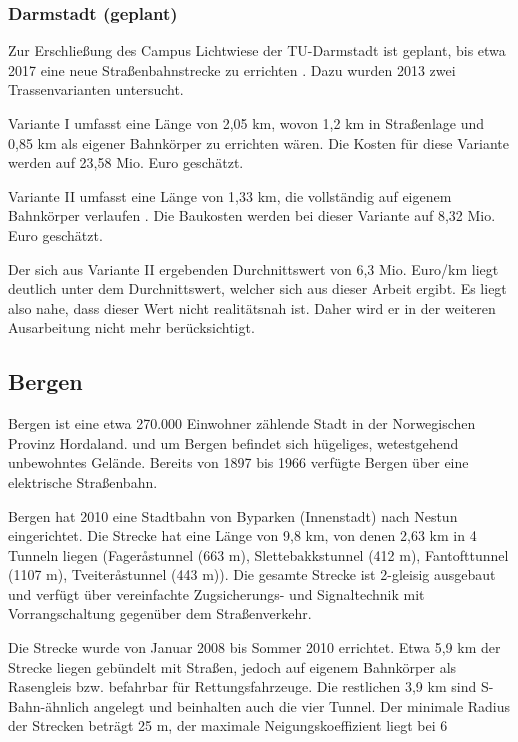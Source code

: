\cite{eoDaAr2}
\cite{eoDaAr3}

\subsubsection*{Darmstadt (geplant)}

Zur Erschließung des Campus Lichtwiese der TU-Darmstadt ist geplant, bis etwa 2017 eine neue
Straßenbahnstrecke zu errichten \cite{mrDaLw}. Dazu wurden 2013 zwei Trassenvarianten untersucht.

Variante I umfasst eine Länge von 2,05 km, wovon 1,2 km in Straßenlage und 0,85 km als
eigener Bahnkörper zu errichten wären. Die Kosten für diese Variante werden auf 23,58 Mio.
Euro geschätzt.

Variante II umfasst eine Länge von 1,33 km, die vollständig auf eigenem Bahnkörper verlaufen \cite{eoDaLw}.
Die Baukosten werden bei dieser Variante auf 8,32 Mio. Euro geschätzt.

Der sich aus Variante II ergebenden Durchnittswert von 6,3 Mio. Euro/km liegt deutlich unter
dem Durchnittswert, welcher sich aus dieser Arbeit ergibt. Es liegt also nahe, dass dieser
Wert nicht realitätsnah ist. Daher wird er in der weiteren Ausarbeitung nicht mehr
berücksichtigt.

\subsection{Bergen}

Bergen ist eine etwa 270.000 Einwohner zählende Stadt in der Norwegischen Provinz Hordaland.
und um Bergen befindet sich hügeliges, wetestgehend unbewohntes Gelände. Bereits von 1897 bis
1966 verfügte Bergen über eine elektrische Straßenbahn.

Bergen hat 2010 eine Stadtbahn von Byparken (Innenstadt) nach Nestun eingerichtet. Die Strecke
hat eine Länge von 9,8 km, von denen 2,63 km in 4 Tunneln liegen (Fageråstunnel (663 m),
Slettebakkstunnel (412 m), Fantofttunnel (1107 m), Tveiteråstunnel (443 m)). Die gesamte
Strecke ist 2-gleisig ausgebaut und verfügt über vereinfachte Zugsicherungs- und Signaltechnik
mit Vorrangschaltung gegenüber dem Straßenverkehr.

Die Strecke wurde von Januar 2008 bis Sommer 2010 errichtet. Etwa 5,9 km der Strecke liegen
gebündelt mit Straßen, jedoch auf eigenem Bahnkörper als Rasengleis bzw. befahrbar für
Rettungsfahrzeuge. Die restlichen 3,9 km sind S-Bahn-ähnlich angelegt und beinhalten auch die
vier Tunnel. Der minimale Radius der Strecken beträgt 25 m, der maximale Neigungskoeffizient
liegt bei 6%

